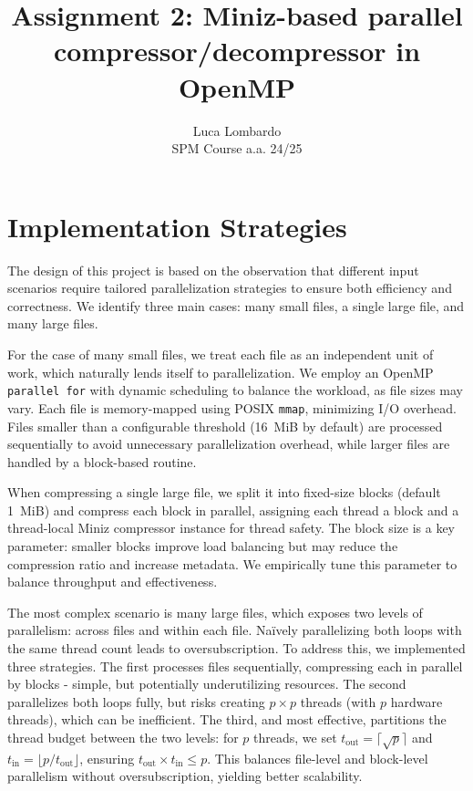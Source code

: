 \documentclass[10pt]{article}
\title{Assignment 2: Miniz-based parallel compressor/decompressor in OpenMP}
\author{Luca Lombardo \\ SPM Course a.a. 24/25}
\date{}
\begin{document}
\maketitle
\vspace{-1.5em}

\section{Implementation Strategies}
The design of this project is based on the observation that different input scenarios require tailored parallelization strategies to ensure both efficiency and correctness. We identify three main cases: many small files, a single large file, and many large files.

For the case of many small files, we treat each file as an independent unit of work, which naturally lends itself to parallelization. We employ an OpenMP \texttt{parallel for} with dynamic scheduling to balance the workload, as file sizes may vary. Each file is memory-mapped using POSIX \texttt{mmap}, minimizing I/O overhead. Files smaller than a configurable threshold (16~MiB by default) are processed sequentially to avoid unnecessary parallelization overhead, while larger files are handled by a block-based routine.

When compressing a single large file, we split it into fixed-size blocks (default 1~MiB) and compress each block in parallel, assigning each thread a block and a thread-local Miniz compressor instance for thread safety. The block size is a key parameter: smaller blocks improve load balancing but may reduce the compression ratio and increase metadata. We empirically tune this parameter to balance throughput and effectiveness.

The most complex scenario is many large files, which exposes two levels of parallelism: across files and within each file. Naïvely parallelizing both loops with the same thread count leads to oversubscription. To address this, we implemented three strategies. The first processes files sequentially, compressing each in parallel by blocks - simple, but potentially underutilizing resources. The second parallelizes both loops fully, but risks creating $p \times p$ threads (with $p$ hardware threads), which can be inefficient. The third, and most effective, partitions the thread budget between the two levels: for $p$ threads, we set $t_{\mathrm{out}} = \lceil \sqrt{p} \rceil$ and $t_{\mathrm{in}} = \lfloor p / t_{\mathrm{out}} \rfloor$, ensuring $t_{\mathrm{out}} \times t_{\mathrm{in}} \leq p$. This balances file-level and block-level parallelism without oversubscription, yielding better scalability.
\end{document}
